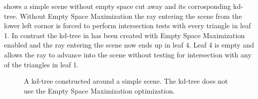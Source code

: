  shows a simple scene without empty space cut
away and its corrosponding kd-tree. Without Empty Space Maximization the ray
entering the scene from the lower left cornor is forced to perform intersection
tests with every triangle in leaf 1. In contrast the kd-tree in
 has been created with Empty Space Maximization
enabled and the ray entering the scene now ends up in leaf 4. Leaf 4 is empty
and allows the ray to advance into the scene without testing for intersection
with any of the triangles in leaf 1.

\begin{figure}
  \centering
  \hspace{5mm}
  
  \caption[Scene without Empty Space Maximization.]{A kd-tree constructed around
    a simple scene. The kd-tree does not use the Empty Space Maximization
    optimization.}
  \label{fig:noEmptySpaceExample}
\end{figure}

